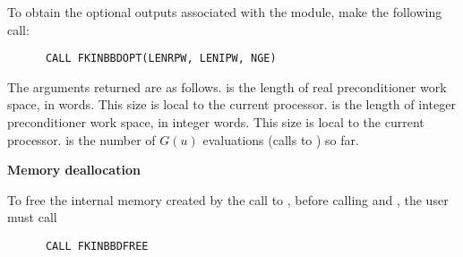 \begin{Steps}
  To obtain the optional outputs associated with the {\kinbbdpre} module, make
  the following call:
\begin{verbatim}
      CALL FKINBBDOPT(LENRPW, LENIPW, NGE)
\end{verbatim}
  The arguments returned are as follows.
   is the length of real preconditioner work space, in 
  words.  This size is local to the current processor.
   is the length of integer preconditioner work space, in integer
  words.  This size is local to the current processor.
   is the number of $G(u)$ evaluations (calls to ) so far.
  
\item {\bf Memory deallocation}

  To free the internal memory created by the call to , before
  calling  and , the user must call
\begin{verbatim}
      CALL FKINBBDFREE
\end{verbatim}

\end{Steps}
